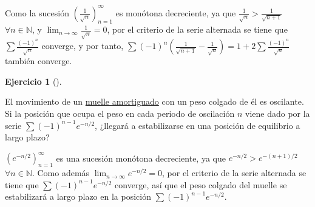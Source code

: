 \documentclass[
  spanish,
  a4paper,
]{scrreport}
\theoremstyle{definition}
\newtheorem{exercise}{Ejercicio}[chapter]
\theoremstyle{remark}
\begin{document}
\begin{tcolorbox}
\begin{enumerate}
  Como la sucesión \(\left(\frac{1}{\sqrt{n}}\right)_{n=1}^\infty\) es
  monótona decreciente, ya que
  \(\frac{1}{\sqrt{n}}>\frac{1}{\sqrt{n+1}}\)
  \(\forall n\in\mathbb{N}\), y
  \(\lim_{n\to\infty} \frac{1}{\sqrt{n}} = 0\), por el criterio de la
  serie alternada se tiene que \(\sum \frac{(-1)^n}{\sqrt{n}}\)
  converge, y por tanto,
  \(\sum (-1)^n\left(\frac{1}{\sqrt{n+1}}-\frac{1}{\sqrt{n}}\right) = 1 + 2\sum \frac{(-1)^n}{\sqrt{n}}\)
  también converge.
\end{enumerate}

\end{tcolorbox}

\begin{exercise}[]\protect\hypertarget{exr-muelle-amortiguado}{}\label{exr-muelle-amortiguado}

El movimiento de un
\href{https://upload.wikimedia.org/wikipedia/commons/f/fa/Spring-mass_under-damped.gif}{muelle
amortiguado} con un peso colgado de él es oscilante. Si la posición que
ocupa el peso en cada periodo de oscilación \(n\) viene dado por la
serie \(\sum (-1)^{n-1}e^{-n/2}\), ¿llegará a estabilizarse en una
posición de equilibrio a largo plazo?

\end{exercise}

\begin{tcolorbox}[enhanced jigsaw, arc=.35mm, bottomrule=.15mm, bottomtitle=1mm, breakable, colback=white, colbacktitle=quarto-callout-tip-color!10!white, colframe=quarto-callout-tip-color-frame, coltitle=black, left=2mm, leftrule=.75mm, opacityback=0, opacitybacktitle=0.6, rightrule=.15mm, title=\textcolor{quarto-callout-tip-color}{\faLightbulb}\hspace{0.5em}{Solución}, titlerule=0mm, toprule=.15mm, toptitle=1mm]

\((e^{-n/2})_{n=1}^\infty\) es una sucesión monótona decreciente, ya que
\(e^{-n/2}>e^{-(n+1)/2}\) \(\forall n\in\mathbb{N}\). Como además
\(\lim_{n\to\infty} e^{-n/2} = 0\), por el criterio de la serie
alternada se tiene que \(\sum (-1)^{n-1}e^{-n/2}\) converge, así que el
peso colgado del muelle se estabilizará a largo plazo en la posición
\(\sum (-1)^{n-1}e^{-n/2}\).

\end{tcolorbox}
\end{document}
